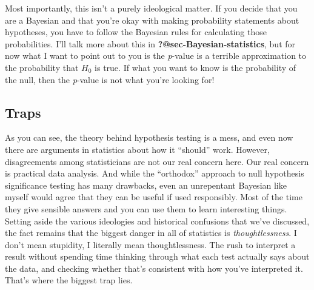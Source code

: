 \documentclass[
  a4paper,
]{book}
\begin{document}
Most importantly, this isn't a purely ideological matter. If you decide
that you are a Bayesian and that you're okay with making probability
statements about hypotheses, you have to follow the Bayesian rules for
calculating those probabilities. I'll talk more about this in
\textbf{?@sec-Bayesian-statistics}, but for now what I want to point out
to you is the \emph{p}-value is a terrible approximation to the
probability that \(H_0\) is true. If what you want to know is the
probability of the null, then the \emph{p}-value is not what you're
looking for!

\hypertarget{traps}{%
\subsection{Traps}\label{traps}}

As you can see, the theory behind hypothesis testing is a mess, and even
now there are arguments in statistics about how it ``should'' work.
However, disagreements among statisticians are not our real concern
here. Our real concern is practical data analysis. And while the
``orthodox'' approach to null hypothesis significance testing has many
drawbacks, even an unrepentant Bayesian like myself would agree that
they can be useful if used responsibly. Most of the time they give
sensible answers and you can use them to learn interesting things.
Setting aside the various ideologies and historical confusions that
we've discussed, the fact remains that the biggest danger in all of
statistics is \emph{thoughtlessness}. I don't mean stupidity, I
literally mean thoughtlessness. The rush to interpret a result without
spending time thinking through what each test actually says about the
data, and checking whether that's consistent with how you've interpreted
it. That's where the biggest trap lies.
\end{document}
